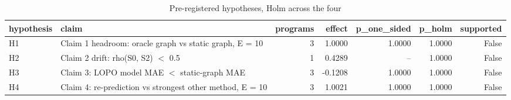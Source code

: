 \begin{table}[t]
\centering
\caption{Pre-registered hypotheses, Holm across the four}
\label{tab:v3-1-primary-hypotheses}
\begin{tabular}{llrrrrr}
\toprule
hypothesis & claim & programs & effect & p\_one\_sided & p\_holm & supported \\
\midrule
H1 & Claim 1 headroom: oracle graph vs static graph, E = 10 & 3 & 1.0000 & 1.0000 & 1.0000 & False \\
H2 & Claim 2 drift: rho(S0, S2) $<$ 0.5 & 1 & 0.4289 & -- & 1.0000 & False \\
H3 & Claim 3: LOPO model MAE $<$ static-graph MAE & 3 & -0.1208 & 1.0000 & 1.0000 & False \\
H4 & Claim 4: re-prediction vs strongest other method, E = 10 & 3 & 1.0021 & 1.0000 & 1.0000 & False \\
\bottomrule
\end{tabular}
\end{table}
